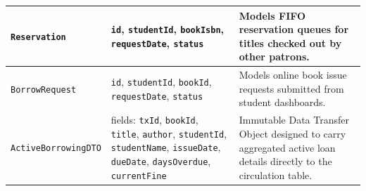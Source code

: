{\begin{longtable}{>{\raggedright\arraybackslash}p{3.8cm} >{\raggedright\arraybackslash}p{4.4cm} >{\raggedright\arraybackslash}p{6.4cm}}
\midrule
\texttt{Reservation} & \texttt{id}, \texttt{studentId}, \texttt{bookIsbn}, \texttt{requestDate}, \texttt{status} & Models FIFO reservation queues for titles checked out by other patrons. \\
\midrule
\texttt{BorrowRequest} & \texttt{id}, \texttt{studentId}, \texttt{bookId}, \texttt{requestDate}, \texttt{status} & Models online book issue requests submitted from student dashboards. \\
\midrule
\texttt{ActiveBorrowingDTO} & 10 fields: \texttt{txId}, \texttt{bookId}, \texttt{title}, \texttt{author}, \texttt{studentId}, \texttt{studentName}, \texttt{issueDate}, \texttt{dueDate}, \texttt{daysOverdue}, \texttt{currentFine} & Immutable Data Transfer Object designed to carry aggregated active loan details directly to the circulation table. \\
\end{longtable}
}

